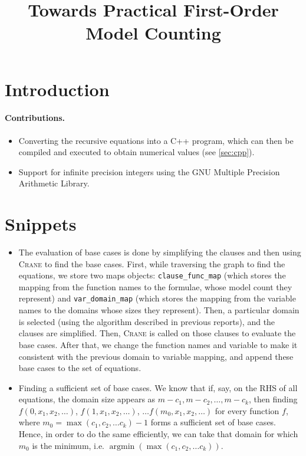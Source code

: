 \documentclass{article}
\title{Towards Practical First-Order Model Counting}
\DeclareMathOperator*{\argmin}{argmin}
\begin{document}
\maketitle

\begin{abstract}
\end{abstract}

\section{Introduction}

\paragraph{Contributions.}
\begin{itemize}
  \item Converting the recursive equations into a C++ program, which can then be
        compiled and executed to obtain numerical values (see \cref{sec:cpp}).
  \item Support for infinite precision integers using the GNU Multiple Precision
        Arithmetic Library.
\end{itemize}

\section{Snippets}

\begin{itemize}
  \item The evaluation of base cases is done by simplifying the clauses and then
        using \textsc{Crane} to find the base cases. First, while traversing the
        graph to find the equations, we store two maps objects:
        \texttt{clause\_func\_map} (which stores the mapping from the function
        names to the formulae, whose model count they represent) and
        \texttt{var\_domain\_map} (which stores the mapping from the variable
        names to the domains whose sizes they represent). Then, a particular
        domain is selected (using the algorithm described in previous reports),
        and the clauses are simplified. Then, \textsc{Crane} is called on those
        clauses to evaluate the base cases. After that, we change the function
        names and variable to make it consistent with the previous domain to
        variable mapping, and append these base cases to the set of equations.
  \item Finding a sufficient set of base cases. We know that if, say, on the RHS
        of all equations, the domain size appears as
        $m - c_1, m - c_2, \dots, m - c_k$, then finding
        $f(0, x_1, x_2, \dots)$, $f(1, x_1, x_2, \dots)$,
        $\dots f(m_0, x_1, x_2, \dots)$ for every function $f$, where
        $m_0 = \max(c_1, c_2, \dots c_k) - 1$ forms a sufficient set of base
        cases. Hence, in order to do the same efficiently, we can take that
        domain for which $m_0$ is the minimum, i.e.
        $\argmin(\max(c_1, c_2, \dots c_k))$.
\end{itemize}
\end{document}
